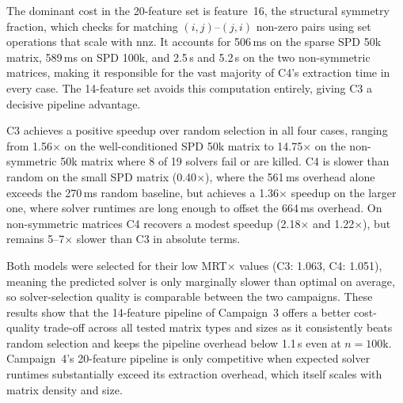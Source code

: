The dominant cost in the 20-feature set is feature~16, the structural symmetry fraction, which checks for matching $(i,j)$--$(j,i)$ non-zero pairs using set operations that scale with $\text{nnz}$.
It accounts for 506\,ms on the sparse SPD 50k matrix, 589\,ms on SPD 100k, and 2.5\,s and 5.2\,s on the two non-symmetric matrices, making it responsible for the vast majority of C4's extraction time in every case.
The 14-feature set avoids this computation entirely, giving C3 a decisive pipeline advantage.

C3 achieves a positive speedup over random selection in all four cases, ranging from 1.56$\times$ on the well-conditioned SPD 50k matrix to 14.75$\times$ on the non-symmetric 50k matrix where 8 of 19 solvers fail or are killed.
C4 is slower than random on the small SPD matrix (0.40$\times$), where the 561\,ms overhead alone exceeds the 270\,ms random baseline, but achieves a 1.36$\times$ speedup on the larger one, where solver runtimes are long enough to offset the 664\,ms overhead.
On non-symmetric matrices C4 recovers a modest speedup (2.18$\times$ and 1.22$\times$), but remains 5--7$\times$ slower than C3 in absolute terms.

Both models were selected for their low MRT$\times$ values (C3: 1.063, C4: 1.051), meaning the predicted solver is only marginally slower than optimal on average, so solver-selection quality is comparable between the two campaigns.
These results show that the 14-feature pipeline of Campaign~3 offers a better cost-quality trade-off across all tested matrix types and sizes as it consistently beats random selection and keeps the pipeline overhead below 1.1\,s even at $n = 100\text{k}$.
Campaign~4's 20-feature pipeline is only competitive when expected solver runtimes substantially exceed its extraction overhead, which itself scales with matrix density and size.
